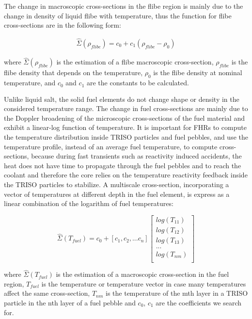 \documentclass{elsarticle}
\begin{document}
The change in macroscopic cross-sections in the flibe region is mainly due to the change in density of liquid flibe with temperature, thus the function for flibe cross-sections are in the following form:

\begin{align}
  \hat{\Sigma}(\rho_{flibe}) = c_0 + c_1(\rho_{flibe} - \rho_0)
  \label{eq:flibe_xs}
\end{align}

where $\hat{\Sigma}(\rho_{flibe})$ is the estimation of a flibe macroscopic cross-section, $\rho_{flibe}$ is the flibe density that depends on the temperature, $\rho_0$ is the flibe density at nominal temperature, and 
$c_0$ and $c_1$ are the constants to be calculated.

Unlike liquid salt, the solid fuel elements do not change shape or density in the considered temperature range. 
The change in fuel cross-sections are mainly due to the Doppler broadening of the microscopic cross-sections of the fuel material and exhibit a linear-log function of temperature.  It is important for FHRs to compute the temperature distribution inside TRISO particles and fuel pebbles, and use the temperature profile, instead of an average fuel temperature, to compute cross-sections, because during fast transients such as reactivity induced accidents, the heat does not have time to propagate through the fuel pebbles and to reach the coolant and therefore the core relies on the temperature reactivity feedback inside the TRISO particles to stabilize.
A multiscale cross-section, incorporating a vector of temperatures at different depth in the fuel element, is express as a linear combination of the logarithm of fuel temperatures:

\begin{equation}
\hat{\Sigma} (T_{fuel}) = c_0 + [c_1, c_2, ... c_n] \begin{bmatrix}
    log(T_{11}) \\
    log(T_{12}) \\
    log(T_{13}) \\
    ...\\
    log(T_{nm})\\
\end{bmatrix}
\label{eq:linear_log}
\end{equation}


where $\hat{\Sigma}(T_{fuel})$ is the estimation of a macroscopic cross-section in the fuel region, $T_{fuel}$ is the temperature or temperature vector in case many temperatures affect the same cross-section, $T_{nm}$ is the temperature of the mth layer in a TRISO particle in the nth layer of a fuel pebble and $c_0$, $c_1$ are the coefficients we search for.
\end{document}
